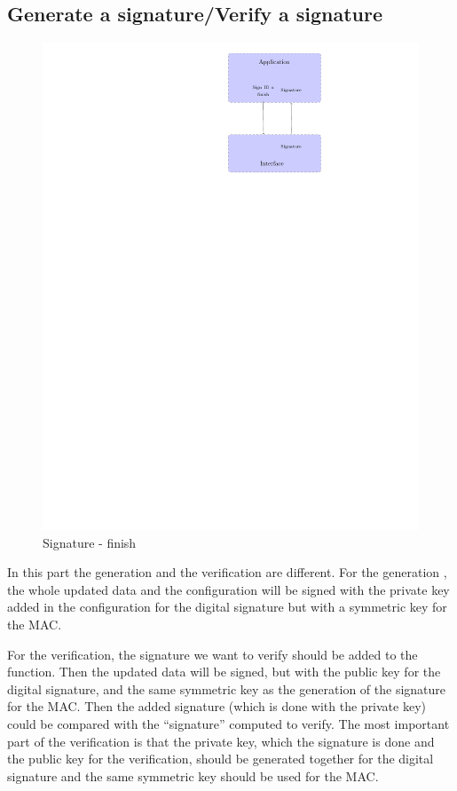 \subsection*{Generate a signature/Verify a signature}
\begin{figure}[!ht]
\centering
\includegraphics[trim=18.5cm 20cm 9.5cm 0cm]{figures/sign_example_finish.pdf}
\caption{Signature - finish\newline}
\label{fig:gci_sign_finish}
\end{figure}
In this part the generation and the verification are different.
For the generation , the whole updated data and the configuration will be signed
with the private key added in the configuration for the digital
signature but with a symmetric key for the MAC.

For the verification, the signature we want to verify should be added to the
function.
Then the updated data will be signed, but with the public key for the
digital signature, and the same symmetric key as the generation of the
signature for the MAC.
Then the added signature (which is done with the
private key) could be compared with the ``signature'' computed to verify.
The most important part of the verification is that the private key, which
the signature is done and the public key for the verification, should be
generated together for the digital signature and the same symmetric key should
be used for the MAC.

